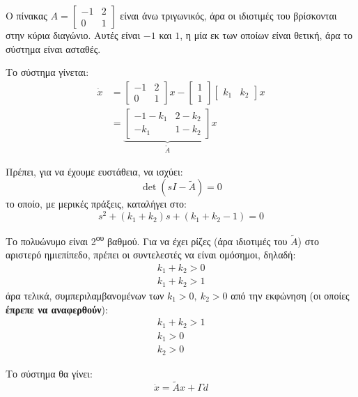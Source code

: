 \documentclass[11pt,a4paper,notitlepage,fleqn]{article}
\begin{document}
\begin{exercise}
	\tcblower
	\begin{enumgreekparen}
		\item Ο πίνακας \( A = \left[\begin{matrix}
		-1 & 2 \\ 0 & 1
		\end{matrix}\right] \) είναι άνω τριγωνικός, άρα οι ιδιοτιμές
		του βρίσκονται στην κύρια διαγώνιο. Αυτές είναι \( -1 \) και
		\( 1 \), η μία εκ των οποίων είναι θετική, άρα το σύστημα είναι
		ασταθές.
		\item
		Το σύστημα γίνεται:
		\begin{align*}
			\dot x &= \left[\begin{matrix}
			-1 & 2 \\ 0 & 1
			\end{matrix}\right]x - \left[\begin{matrix}
			1 \\ 1
			\end{matrix}\right]\left[\begin{matrix}
			k_1 & k_2
			\end{matrix}\right]x
			\\ &= \underbrace{\left[\begin{matrix}
			-1-k_1 & 2-k_2 \\
			-k_1 & 1-k_2
			\end{matrix}\right]}_{\tilde A}x
		\end{align*}

		Πρέπει, για να έχουμε ευστάθεια, να ισχύει:
		\[
		\det(sI-\tilde A) = 0
		\]
		το οποίο, με μερικές πράξεις, καταλήγει στο:
		\[
		s^2 + (k_1+k_2)s + (k_1+k_2 -1) = 0
		\]

		Το πολυώνυμο είναι 2\textsuperscript{ου} βαθμού. Για να έχει
		ρίζες (άρα ιδιοτιμές του \( \tilde A \)) στο αριστερό ημιεπίπεδο,
		πρέπει οι συντελεστές να είναι ομόσημοι, δηλαδή:
		\begin{gather*}
			k_1 + k_2 > 0\\
			k_1+k_2 > 1
		\end{gather*}
		άρα τελικά, συμπεριλαμβανομένων των \( k_1>0,\ k_2>0 \) από
		την εκφώνηση (οι οποίες \textbf{έπρεπε να αναφερθούν}):
		\begin{gather*}
			k_1+k_2 > 1\\
			k_1 > 0\\
			k_2 > 0
		\end{gather*}
        \item Το σύστημα θα γίνει:
        \[
        \dot x = \tilde A x + Γd
        \]


\end{enumgreekparen}
\end{exercise}
\end{document}
